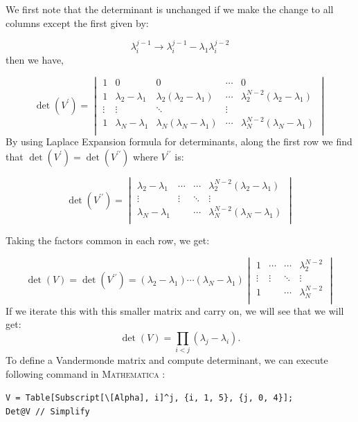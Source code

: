 \documentclass[11pt]{article}
\newcommand{\MA}{\textsc{Mathematica }}
\begin{document}
We first note that the determinant is unchanged
if we make the change to all columns except the first given by:

\begin{equation}
	\lambda_{i}^{j-1} \to \lambda_{i}^{j-1} - \lambda_{1} \lambda_{i}^{j-2}
\end{equation}
then we have, 

\begin{equation}
	\det(V^{\prime}) = 
	\begin{vmatrix}
		1 & 0 & 0 & \cdots & 0 \\
		1 & \lambda_2 - \lambda_1 & \lambda_2(\lambda_2 - \lambda_1) & \cdots & \lambda_2^{N-2}(\lambda_2 - \lambda_1) \\ 
		\vdots  & \vdots  & \ddots & \vdots  \\
		1 & \lambda_N - \lambda_1 & \lambda_N(\lambda_N - \lambda_1) & \cdots & \lambda_N^{N-2}(\lambda_N - \lambda_1) \\
	\end{vmatrix}
\end{equation}
By using Laplace Expansion formula for determinants, along the first row we find that $\det(V^{\prime}) = \det(V^{\prime\prime})$ where $V^{\prime\prime}$ is:

\begin{equation}
	\det(V^{\prime\prime}) = 
	\begin{vmatrix}
		 \lambda_2 - \lambda_1 & \cdots & \cdots & \lambda_2^{N-2}(\lambda_2 - \lambda_1) \\ 
		\vdots  & \vdots  & \ddots & \vdots  \\
		\lambda_N - \lambda_1 &  & \cdots &  \lambda_N^{N-2}(\lambda_N - \lambda_1) \\
	\end{vmatrix}
\end{equation}

Taking the factors common in each row, we get:

\begin{equation}
	\det(V) = \det(V^{\prime\prime}) = 
	(\lambda_2 - \lambda_1) \cdots (\lambda_N - \lambda_1)
	\begin{vmatrix}
		1 & \cdots & \cdots & \lambda_2^{N-2} \\ 
		\vdots  & \vdots  & \ddots & \vdots  \\
		1 &  & \cdots &  \lambda_N^{N-2} \\
	\end{vmatrix}
\end{equation}
If we iterate this with this smaller matrix and carry on, we will see that we will get:
\begin{equation}
	\det(V) = \prod_{i<j} (\lambda_j - \lambda_i).
\end{equation}
To define a Vandermonde matrix and compute determinant, we can execute following command in \MA:
\begin{mdframed}[backgroundcolor=magenta!2]
	\begin{footnotesize} 
		\verb"V = Table[Subscript[\[Alpha], i]^j, {i, 1, 5}, {j, 0, 4}];"\\ 
		\verb"Det@V // Simplify"
	\end{footnotesize} 
\end{mdframed}
\end{document}
